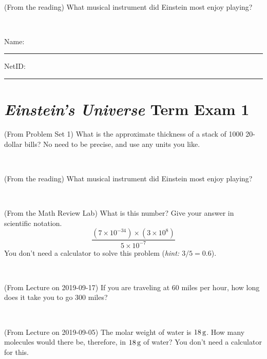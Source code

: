 \documentclass[12pt, letterpaper]{article}
\begin{document}
\vfill ~

\begin{problem} (From the reading)
What musical instrument did Einstein most enjoy playing?
\end{problem}


\vfill ~


\cleardoublepage



\noindent
Name: \rule[-1ex]{0.60\textwidth}{0.1pt}
NetID: \rule[-1ex]{0.20\textwidth}{0.1pt}

\section*{\textsl{Einstein's Universe} Term Exam 1}
\setcounter{problem}{1}


\begin{problem} (From Problem Set 1)
What is the approximate thickness of a stack of 1000 20-dollar bills?
No need to be precise, and use any units you like.
\end{problem}


\vfill ~

\begin{problem} (From the reading)
What musical instrument did Einstein most enjoy playing?
\end{problem}


\vfill ~

\begin{problem} (From the Math Review Lab)
What is this number? Give your answer in scientific notation.
$$
\frac{(7\times10^{-34})\times(3\times10^8)}{5\times10^{-7}}
$$
You don't need a calculator to solve this problem (\textit{hint: $3/5=0.6$}).
\end{problem}


\vfill ~

\begin{problem} (From Lecture on 2019-09-17)
If you are traveling at 60 miles per hour, how long does
it take you to go 300 miles?
\end{problem}


\vfill ~


\clearpage


\begin{problem} (From Lecture on 2019-09-05)
The molar weight of water is $18\,\mathrm{g}$. How many molecules would there
be, therefore, in $18\,\mathrm{g}$ of water? You don't need a calculator for
this.
\end{problem}


\vfill ~
\end{document}

